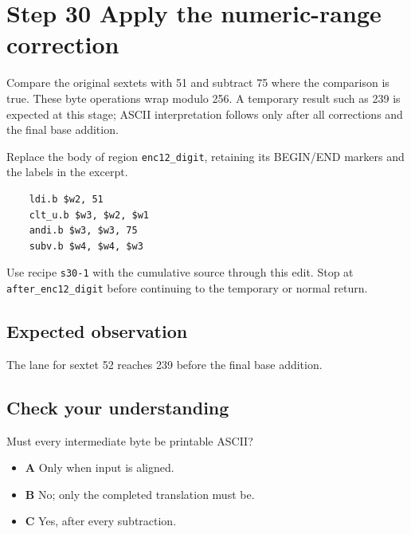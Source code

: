\section{Step 30 Apply the numeric-range correction}\label{base64-s30}

Compare the original sextets with 51 and subtract 75 where the comparison is true. These byte operations wrap modulo 256. A temporary result such as 239 is expected at this stage; ASCII interpretation follows only after all corrections and the final base addition.

Replace the body of region \texttt{enc12\_digit}, retaining its BEGIN/END markers and the labels in the excerpt.

\begin{verbatim}
    ldi.b $w2, 51
    clt_u.b $w3, $w2, $w1
    andi.b $w3, $w3, 75
    subv.b $w4, $w4, $w3
\end{verbatim}

Use recipe \texttt{s30-1} with the cumulative source through this edit. Stop at \texttt{after\_enc12\_digit} before continuing to the temporary or normal return.

\subsection{Expected observation}
The lane for sextet 52 reaches 239 before the final base addition.

\subsection{Check your understanding}
Must every intermediate byte be printable ASCII?

\begin{itemize}
  \item \textbf{A} Only when input is aligned.
  \item \textbf{B} No; only the completed translation must be.
  \item \textbf{C} Yes, after every subtraction.
\end{itemize}
